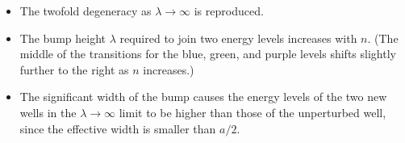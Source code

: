 \documentclass[12pt]{article}
\begin{document}
\begin{itemize}
  \item The twofold degeneracy as $\lambda \to \infty$ is reproduced.

  \item The bump height $\lambda$ required to join two energy levels increases
    with $n$. (The middle of the transitions for the blue, green, and purple
    levels shifts slightly further to the right as $n$ increases.)

  \item The significant width of the bump causes the energy levels of the two
    new wells in the $\lambda \to \infty$ limit to be higher than those of the
    unperturbed well, since the effective width is smaller than $a / 2$.
\end{itemize}

\printbibliography%
\end{document}
